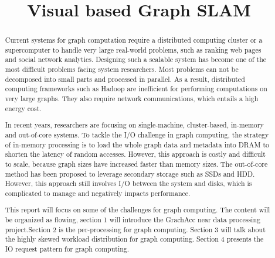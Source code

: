 \documentclass[acmlarge]{acmart}
\begin{document}
\title{Visual based Graph SLAM} 





\begin{abstract}
Current systems for graph computation require a distributed computing cluster or a supercomputer to handle very large real-world problems, such as ranking web pages and social network analytics. Designing such a scalable system has become one of the most difficult problems facing system researchers. Most problems can not be decomposed into small parts and processed in parallel.  As a result, distributed computing frameworks such as Hadoop are inefficient for performing computations on very large graphs. They also require network communications, which entails a high energy cost.

In recent years, researchers are focusing on single-machine, cluster-based, in-memory and out-of-core systems. To tackle the I/O challenge in graph computing, the strategy of in-memory processing is to load the whole graph data and metadata into DRAM to shorten the latency of random accesses. However, this approach is costly and difficult to scale, because graph sizes have increased faster than memory sizes. The out-of-core method has been proposed to leverage secondary storage such as SSDs and HDD. However, this approach still involves I/O between the system and disks, which is complicated to manage and negatively impacts performance.

This report will focus on some of the challenges for graph computing. The content will be organized as flowing, section 1 will introduce the GrachAcc near data processing project.Section 2 is the per-processing for graph computing. Section 3 will talk about the highly skewed workload distribution for graph computing. Section 4 presents the IO request pattern for graph computing. 

\end{abstract}



\maketitle



\end{document}
